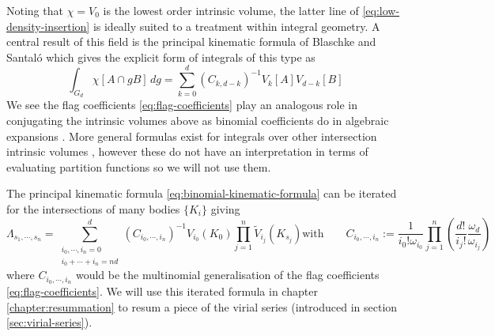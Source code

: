 \begin{tcolorbox}[title=Principal kinematic formula]
  Noting that $\chi = V_0$ is the lowest order intrinsic volume, the latter line of \eqref{eq:low-density-insertion} is ideally suited to a treatment within integral geometry.
  A central result of this field is the principal kinematic formula of Blaschke and Santal\'o \cite{BlaschkeMZ1936,Blaschke1937,SantaloASI1936} which gives the explicit form of integrals of this type as \cite{Santalo2004,Klain1997}
  \begin{equation}\label{eq:binomial-kinematic-formula}
    \int_{G_d} \chi[A \cap gB] \, dg
    =
    \sum_{k=0}^d (C_{k,d-k})^{-1} V_k[A] V_{d-k}[B]
  \end{equation}
  We see the flag coefficients \eqref{eq:flag-coefficients} play an analogous role in conjugating the intrinsic volumes above as binomial coefficients do in algebraic expansions%
  .
  More general formulas exist for integrals over other intersection intrinsic volumes \cite{Klain1997}, however these do not have an interpretation in terms of evaluating partition functions so we will not use them.
\end{tcolorbox}

The principal kinematic formula \eqref{eq:binomial-kinematic-formula} can be iterated for the intersections of many bodies $\{K_i\}$ giving \cite{Santalo2004,MarechalPRE2014}
\begin{subequations}\label{eq:multinomial-kinematic-formula}
  \begin{equation}
    \Lambda_{s_1, \cdots, s_n}
    =
      \sum_{\substack{i_0, \cdots, i_n = 0 \\ i_0 + \cdots + i_n = nd}}^d
      (C_{i_0, \cdots, i_n})^{-1}
      V_{i_0}(K_0)
      \prod_{j=1}^n
      \widetilde{V}_{i_j}(K_{s_j})
  \end{equation}
  \begin{equation}
    \textrm{with} \qquad
    C_{i_0, \cdots, i_n}
    := \frac{1}{i_0! \omega_{i_0}}
    \prod_{j=1}^n
    \left(
    \frac{d!}{i_j!} \frac{\omega_d}{\omega_{i_j}}
    \right)
  \end{equation}
\end{subequations}
where $C_{i_0, \cdots, i_n}$ would be the multinomial generalisation of the flag coefficients \eqref{eq:flag-coefficients}.
We will use this iterated formula in chapter \ref{chapter:resummation} to resum a piece of the virial series (introduced in section \ref{sec:virial-series}).

